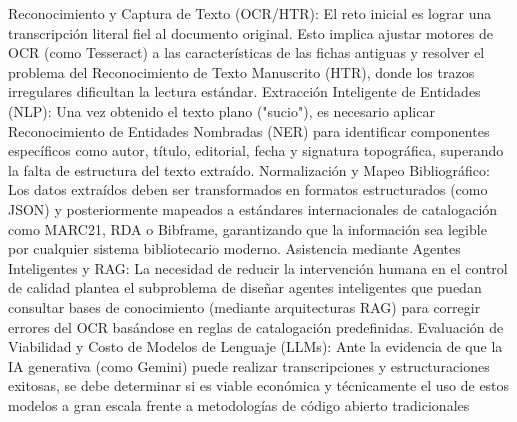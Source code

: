     Reconocimiento y Captura de Texto (OCR/HTR): El reto inicial es lograr una transcripción literal fiel al documento original. Esto implica ajustar motores de OCR (como Tesseract) a las características de las fichas antiguas y resolver el problema del Reconocimiento de Texto Manuscrito (HTR), donde los trazos irregulares dificultan la lectura estándar.
    Extracción Inteligente de Entidades (NLP): Una vez obtenido el texto plano ("sucio"), es necesario aplicar Reconocimiento de Entidades Nombradas (NER) para identificar componentes específicos como autor, título, editorial, fecha y signatura topográfica, superando la falta de estructura del texto extraído.
    Normalización y Mapeo Bibliográfico: Los datos extraídos deben ser transformados en formatos estructurados (como JSON) y posteriormente mapeados a estándares internacionales de catalogación como MARC21, RDA o Bibframe, garantizando que la información sea legible por cualquier sistema bibliotecario moderno.
    Asistencia mediante Agentes Inteligentes y RAG: La necesidad de reducir la intervención humana en el control de calidad plantea el subproblema de diseñar agentes inteligentes que puedan consultar bases de conocimiento (mediante arquitecturas RAG) para corregir errores del OCR basándose en reglas de catalogación predefinidas.
    Evaluación de Viabilidad y Costo de Modelos de Lenguaje (LLMs): Ante la evidencia de que la IA generativa (como Gemini) puede realizar transcripciones y estructuraciones exitosas, se debe determinar si es viable económica y técnicamente el uso de estos modelos a gran escala frente a metodologías de código abierto tradicionales
